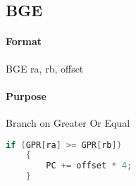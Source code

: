 \subsection{BGE}


\paragraph{Format} BGE ra, rb, offset

\paragraph{Purpose} Branch on Greater Or Equal

\begin{lstlisting}[language=c]
    if (GPR[ra] >= GPR[rb])
    {
        PC += offset * 4;
    }
\end{lstlisting}
